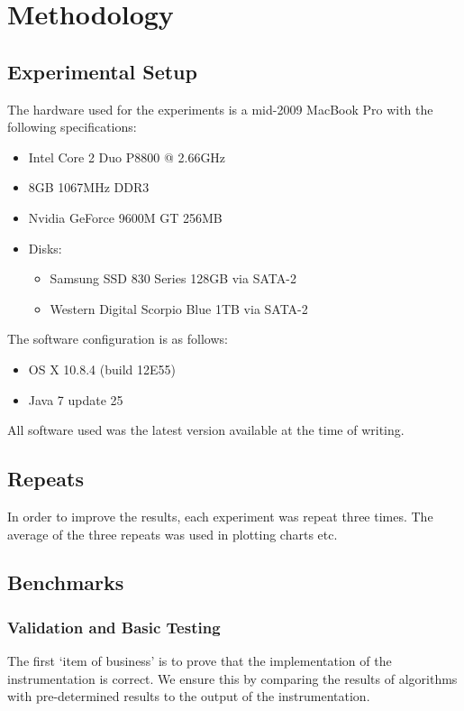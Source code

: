\chapter{Methodology} \label{sec:methodology}
\section{Experimental Setup} \label{sec:methodology/setup}
The hardware used for the experiments is a mid-2009 MacBook Pro with the following specifications:
	
\begin{itemize}
	\item Intel Core 2 Duo P8800 @ 2.66GHz
	\item 8GB 1067MHz DDR3
	\item Nvidia GeForce 9600M GT 256MB
	\item Disks:
	\begin{itemize}
		\item Samsung SSD 830 Series 128GB via SATA-2
		\item Western Digital Scorpio Blue 1TB via SATA-2
	\end{itemize}
\end{itemize}

The software configuration is as follows:
\begin{itemize}
	\item OS X 10.8.4 (build 12E55)
	\item Java 7 update 25
\end{itemize}

All software used was the latest version available at the time of writing.

\section{Repeats} \label{sec:methodology/repeats}
In order to improve the results, each experiment was repeat three times. The average of the three repeats was used in plotting charts etc.

\section{Benchmarks} \label{sec:methodology/benchmarks}
	\subsection{Validation and Basic Testing} \label{sec:methodology/benchmarks/simple}
	The first `item of business' is to prove that the implementation of the instrumentation is correct. We ensure this by comparing the results of algorithms with pre-determined results to the output of the instrumentation.
	

